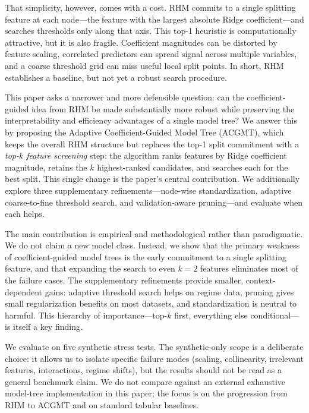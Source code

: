 \documentclass[11pt,a4paper]{article}
\begin{document}
That simplicity, however, comes with a cost. RHM commits to a single splitting feature at each node---the feature with the largest absolute Ridge coefficient---and searches thresholds only along that axis. This top-1 heuristic is computationally attractive, but it is also fragile. Coefficient magnitudes can be distorted by feature scaling, correlated predictors can spread signal across multiple variables, and a coarse threshold grid can miss useful local split points. In short, RHM establishes a baseline, but not yet a robust search procedure.

This paper asks a narrower and more defensible question: can the coefficient-guided idea from RHM be made substantially more robust while preserving the interpretability and efficiency advantages of a single model tree? We answer this by proposing the Adaptive Coefficient-Guided Model Tree (ACGMT), which keeps the overall RHM structure but replaces the top-1 split commitment with a \emph{top-$k$ feature screening} step: the algorithm ranks features by Ridge coefficient magnitude, retains the $k$ highest-ranked candidates, and searches each for the best split. This single change is the paper's central contribution. We additionally explore three supplementary refinements---node-wise standardization, adaptive coarse-to-fine threshold search, and validation-aware pruning---and evaluate when each helps.

The main contribution is empirical and methodological rather than paradigmatic. We do not claim a new model class. Instead, we show that the primary weakness of coefficient-guided model trees is the early commitment to a single splitting feature, and that expanding the search to even $k\!=\!2$ features eliminates most of the failure cases. The supplementary refinements provide smaller, context-dependent gains: adaptive threshold search helps on regime data, pruning gives small regularization benefits on most datasets, and standardization is neutral to harmful. This hierarchy of importance---top-$k$ first, everything else conditional---is itself a key finding.

We evaluate on five synthetic stress tests. The synthetic-only scope is a deliberate choice: it allows us to isolate specific failure modes (scaling, collinearity, irrelevant features, interactions, regime shifts), but the results should not be read as a general benchmark claim. We do not compare against an external exhaustive model-tree implementation in this paper; the focus is on the progression from RHM to ACGMT and on standard tabular baselines.
\end{document}
